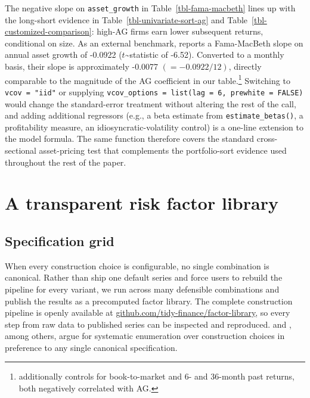 \documentclass[
  article]{jss}
\begin{document}
The negative slope on \texttt{asset\_growth} in
Table~\ref{tbl-fama-macbeth} lines up with the long-short evidence in
Table~\ref{tbl-univariate-sort-ag} and
Table~\ref{tbl-customized-comparison}: high-AG firms earn lower
subsequent returns, conditional on size. As an external benchmark,
\citet[Table III, Panel A, Model 1]{cooper.2008} reports a Fama-MacBeth
slope on annual asset growth of -0.0922 (\(t\)\textasciitilde statistic
of -6.52). Converted to a monthly basis, their slope is approximately
-0.0077 \((=-0.0922/12)\), directly comparable to the magnitude of the
AG coefficient in our table.\footnote{\citet{cooper.2008} additionally
  controls for book-to-market and 6- and 36-month past returns, both
  negatively correlated with AG.} Switching to \texttt{vcov\ =\ "iid"}
or supplying
\texttt{vcov\_options\ =\ list(lag\ =\ 6,\ prewhite\ =\ FALSE)} would
change the standard-error treatment without altering the rest of the
call, and adding additional regressors (e.g., a beta estimate from
\texttt{estimate\_betas()}, a profitability measure, an
idiosyncratic-volatility control) is a one-line extension to the model
formula. The same function therefore covers the standard cross-sectional
asset-pricing test that complements the portfolio-sort evidence used
throughout the rest of the paper.

\section{A transparent risk factor library}\label{sec-library}

\subsection{Specification grid}\label{sec-specification-grid}

When every construction choice is configurable, no single combination is
canonical. Rather than ship one default series and force users to
rebuild the pipeline for every variant, we run  across
many defensible combinations and publish the results as a precomputed
factor library. The complete construction pipeline is openly available
at
\href{https://github.com/tidy-finance/factor-library}{github.com/tidy-finance/factor-library},
so every step from raw data to published series can be inspected and
reproduced. \citet{walter.2024} and \citet{gruber.2025}, among others,
argue for systematic enumeration over construction choices in preference
to any single canonical specification.
\end{document}
